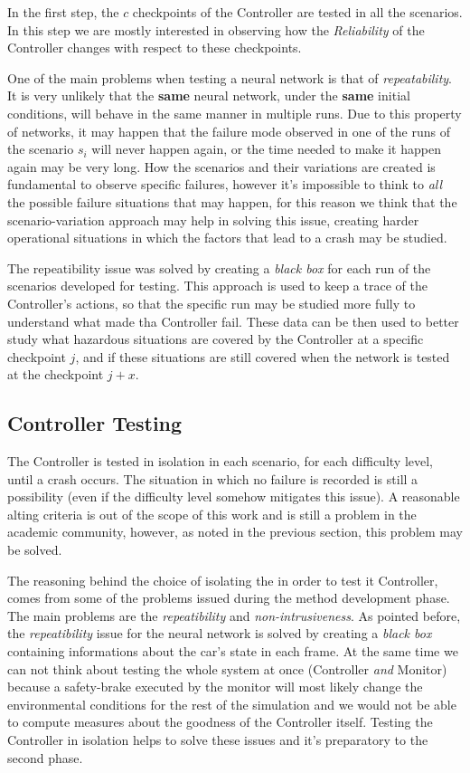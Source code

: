 In the first step, the $c$ checkpoints of the Controller are tested in all the scenarios. In this step we are mostly interested in observing how the \textsl{Reliability} of the Controller changes with respect to these checkpoints.

One of the main problems when testing a neural network is that of \textsl{repeatability}. It is very unlikely that the \textbf{same} neural network, under the \textbf{same} initial conditions, will behave in the same manner in multiple runs. Due to this property of networks, it may happen that the failure mode observed in one of the runs of the scenario $s_{i}$ will never happen again, or the time needed to make it happen again may be very long.
How the scenarios and their variations are created is fundamental to observe specific failures, however it's impossible to think to \textsl{all} the possible failure situations that may happen, for this reason we think that the scenario-variation approach may help in solving this issue, creating harder operational situations in which the factors that lead to a crash may be studied.

The repeatibility issue was solved by creating a \textsl{black box} for each run of the scenarios developed for testing. This approach is used to keep a trace of the Controller's actions, so that the specific run may be studied more fully to understand what made tha Controller fail. These data can be then used to better study what hazardous situations are covered by the Controller at a specific checkpoint $j$, and if these situations are still covered when the network is tested at the checkpoint $j+x$.\newline


\subsection{Controller Testing}

The Controller is tested in isolation in each scenario, for each difficulty level, until a crash occurs. The situation in which no failure is recorded is still a possibility (even if the difficulty level somehow mitigates this issue). A reasonable alting criteria is out of the scope of this work and is still a problem in the academic community, however, as noted in the previous section, this problem may be solved.\cite{zhaoStrigini}

The reasoning behind the choice of isolating the in order to test it Controller, comes from some of the problems issued during the method development phase.
The main problems are the \textsl{repeatibility} and \textsl{non-intrusiveness}. As pointed before, the \textsl{repeatibility} issue for the neural network is solved by creating a \textsl{black box} containing informations about the car's state in each frame. At the same time we can not think about testing the whole system at once (Controller \textsl{and} Monitor) because a safety-brake executed by the monitor will most likely change the environmental conditions for the rest of the simulation and we would not be able to compute measures about the goodness of the Controller itself. Testing the Controller in isolation helps to solve these issues and it's preparatory to the second phase.

